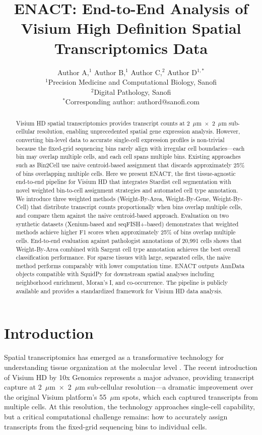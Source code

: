 \documentclass[11pt]{article}
\title{ENACT: End-to-End Analysis of Visium High Definition Spatial Transcriptomics Data}
\author{Author A,$^{1}$ Author B,$^{1}$ Author C,$^{2}$ Author D$^{1,*}$\\
\small $^{1}$Precision Medicine and Computational Biology, Sanofi\\
\small $^{2}$Digital Pathology, Sanofi\\
\small $^{*}$Corresponding author: authord@sanofi.com}
\date{}
\begin{document}
\maketitle

\begin{abstract}
Visium HD spatial transcriptomics provides transcript counts at 2~$\mu$m~$\times$~2~$\mu$m sub-cellular resolution, enabling unprecedented spatial gene expression analysis. However, converting bin-level data to accurate single-cell expression profiles is non-trivial because the fixed-grid sequencing bins rarely align with irregular cell boundaries---each bin may overlap multiple cells, and each cell spans multiple bins. Existing approaches such as Bin2Cell use naive centroid-based assignment that discards approximately 25\% of bins overlapping multiple cells. Here we present ENACT, the first tissue-agnostic end-to-end pipeline for Visium HD that integrates Stardist cell segmentation with novel weighted bin-to-cell assignment strategies and automated cell type annotation. We introduce three weighted methods (Weight-By-Area, Weight-By-Gene, Weight-By-Cell) that distribute transcript counts proportionally when bins overlap multiple cells, and compare them against the naive centroid-based approach. Evaluation on two synthetic datasets (Xenium-based and seqFISH+-based) demonstrates that weighted methods achieve higher F1 scores when approximately 25\% of bins overlap multiple cells. End-to-end evaluation against pathologist annotations of 20,991 cells shows that Weight-By-Area combined with Sargent cell type annotation achieves the best overall classification performance. For sparse tissues with large, separated cells, the naive method performs comparably with lower computation time. ENACT outputs AnnData objects compatible with SquidPy for downstream spatial analyses including neighborhood enrichment, Moran's I, and co-occurrence. The pipeline is publicly available and provides a standardized framework for Visium HD data analysis.
\end{abstract}

\section{Introduction}

Spatial transcriptomics has emerged as a transformative technology for understanding tissue organization at the molecular level \citep{stahl2016visualization}. The recent introduction of Visium HD by 10x Genomics represents a major advance, providing transcript capture at 2~$\mu$m~$\times$~2~$\mu$m sub-cellular resolution---a dramatic improvement over the original Visium platform's 55~$\mu$m spots, which each captured transcripts from multiple cells. At this resolution, the technology approaches single-cell capability, but a critical computational challenge remains: how to accurately assign transcripts from the fixed-grid sequencing bins to individual cells.
\end{document}
